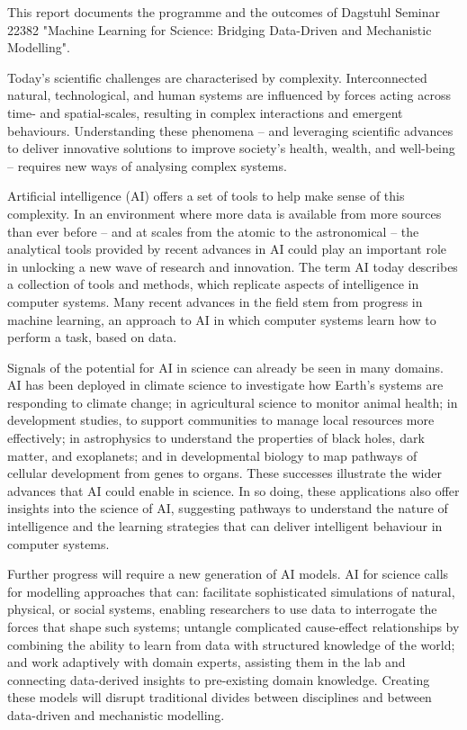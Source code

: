 This report documents the programme and the outcomes of Dagstuhl Seminar 22382 "Machine Learning for Science: Bridging Data-Driven and Mechanistic Modelling".

Today's scientific challenges are characterised by complexity.
Interconnected natural, technological, and human systems are influenced
by forces acting across time- and spatial-scales, resulting in complex
interactions and emergent behaviours. Understanding these phenomena --
and leveraging scientific advances to deliver innovative solutions to
improve society's health, wealth, and well-being -- requires new ways of
analysing complex systems.

Artificial intelligence (AI) offers a set of tools to help make sense of
this complexity. In an environment where more data is available from
more sources than ever before -- and at scales from the atomic to the
astronomical -- the analytical tools provided by recent advances in AI
could play an important role in unlocking a new wave of research and
innovation. The term AI today describes a collection of tools and
methods, which replicate aspects of intelligence in computer systems.
Many recent advances in the field stem from progress in machine
learning, an approach to AI in which computer systems learn how to
perform a task, based on data.

Signals of the potential for AI in science can already be seen in many
domains. AI has been deployed in climate science to investigate how
Earth's systems are responding to climate change; in agricultural
science to monitor animal health; in development studies, to support
communities to manage local resources more effectively; in astrophysics
to understand the properties of black holes, dark matter, and
exoplanets; and in developmental biology to map pathways of cellular
development from genes to organs. These successes illustrate the wider
advances that AI could enable in science. In so doing, these
applications also offer insights into the science of AI, suggesting
pathways to understand the nature of intelligence and the learning
strategies that can deliver intelligent behaviour in computer systems.

Further progress will require a new generation of AI models. AI for
science calls for modelling approaches that can: facilitate
sophisticated simulations of natural, physical, or social systems,
enabling researchers to use data to interrogate the forces that shape
such systems; untangle complicated cause-effect relationships by
combining the ability to learn from data with structured knowledge of
the world; and work adaptively with domain experts, assisting them in
the lab and connecting data-derived insights to pre-existing domain
knowledge. Creating these models will disrupt traditional divides
between disciplines and between data-driven and mechanistic modelling.

